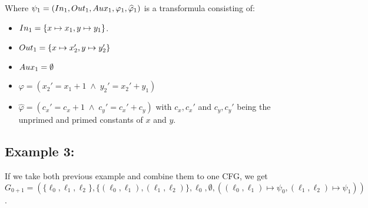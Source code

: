 \documentclass{article}
\begin{document}
\bigskip

	Where $\psi_1 = (In_1, Out_1, Aux_1, \varphi_1, \widehat{\varphi}_1)$ is a transformula consisting of: 
	\begin{itemize}
		\item $In_1 = \{x \mapsto x_1, y \mapsto y_1 \}$.
		\item $Out_1 = \{ x \mapsto x_2', y \mapsto y_2' \}$
		\item $Aux_1 = \emptyset $
		\item $	\varphi = ( x_{2}' = x_{1} + 1 \; \land \; y_{2}' = x_{2}' + y_{1} ) $
		\item $\widehat{\varphi} = ( c_{x}' = c_x + 1 \;\land\; c_{y}' = c_{x}' + c_y ) $ with $c_x, c_x'$ and $c_y, c_y'$ being the unprimed and primed constants of $x$ and $y$.
	\end{itemize}
    
	
	\subsection*{Example 3:}
	If we take both previous example and combine them to one CFG, we get \\ $G_{0+1} = (\{ \ell_0, \ell_1, \ell_2\}, \{ (\ell_0, \ell_1), (\ell_1, \ell_2)\}, \ell_0, \emptyset, ((\ell_0, \ell_1) \mapsto \psi_0, (\ell_1, \ell_2) \mapsto \psi_1))$.
	
	\bigskip
\end{document}
